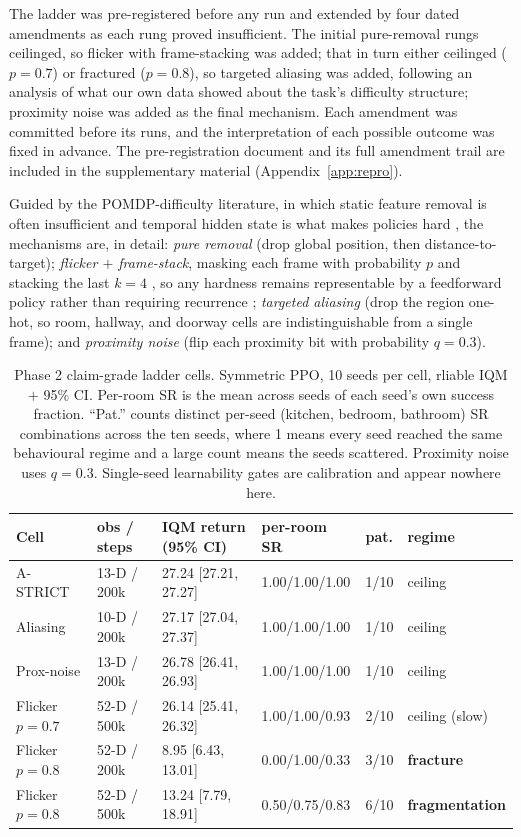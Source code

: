 \documentclass{article}
\begin{document}
The ladder was pre-registered before any run and extended by four dated amendments as each
rung proved insufficient. The initial pure-removal rungs ceilinged, so flicker with
frame-stacking was added; that in turn either ceilinged ($p=0.7$) or fractured ($p=0.8$), so
targeted aliasing was added, following an analysis of what our own data showed about the
task's difficulty structure; proximity noise was added as the final mechanism. Each amendment
was committed before its runs, and the interpretation of each possible outcome was fixed in
advance. The pre-registration document and its full amendment trail are included in the
supplementary material (Appendix~\ref{app:repro}).

Guided by the POMDP-difficulty literature, in which static feature removal is often
insufficient and temporal hidden state is what makes policies hard
\citep{hausknecht2015drqn,morad2023popgym}, the mechanisms are, in detail:
\emph{pure removal} (drop global position, then distance-to-target);
\emph{flicker $+$ frame-stack}, masking each frame with probability $p$
and stacking the last $k=4$ \citep{mnih2015human}, so any hardness remains representable by a
feedforward policy rather than requiring recurrence \citep{kapturowski2019r2d2};
\emph{targeted aliasing} (drop the region one-hot, so room, hallway, and doorway cells are
indistinguishable from a single frame); and \emph{proximity noise} (flip each proximity bit
with probability $q=0.3$).

\begin{table}[t]
\caption{Phase 2 claim-grade ladder cells. Symmetric PPO, 10 seeds per cell, rliable IQM $+$
95\% CI. Per-room SR is the mean across seeds of each seed's own success fraction.
``Pat.'' counts distinct per-seed (kitchen, bedroom, bathroom) SR combinations across the ten
seeds, where 1 means every seed reached the same behavioural regime and a large count means
the seeds scattered. Proximity noise uses $q=0.3$. Single-seed learnability gates are
calibration and appear nowhere here.}
\label{tab:ladder}
\centering
\small
\setlength{\tabcolsep}{4pt}
\begin{tabular}{llllll}
\toprule
Cell & obs / steps & IQM return (95\% CI) & per-room SR & pat. & regime \\
\midrule
A-STRICT & 13-D / 200k & 27.24 [27.21, 27.27] & 1.00/1.00/1.00 & 1/10 & ceiling \\
Aliasing & 10-D / 200k & 27.17 [27.04, 27.37] & 1.00/1.00/1.00 & 1/10 & ceiling \\
Prox-noise & 13-D / 200k & 26.78 [26.41, 26.93] & 1.00/1.00/1.00 & 1/10 & ceiling \\
Flicker $p{=}0.7$ & 52-D / 500k & 26.14 [25.41, 26.32] & 1.00/1.00/0.93 & 2/10 & ceiling (slow) \\
Flicker $p{=}0.8$ & 52-D / 200k & \phantom{0}8.95 [\phantom{0}6.43, 13.01] & 0.00/1.00/0.33 & 3/10 & \textbf{fracture} \\
Flicker $p{=}0.8$ & 52-D / 500k & 13.24 [\phantom{0}7.79, 18.91] & 0.50/0.75/0.83 & 6/10 & \textbf{fragmentation} \\
\bottomrule
\end{tabular}
\end{table}
\end{document}
